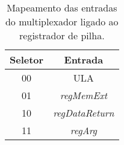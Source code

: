 \begin{table}[]
\centering
\begin{tabular}{|c|c|}
\hline
\textbf{Seletor} & \textbf{Entrada}       \\ \hline
00      & ULA           \\ \hline
01      & \textit{regMemExt}     \\ \hline
10      & \textit{regDataReturn} \\ \hline
11      & \textit{regArg}        \\ \hline
\end{tabular}
\caption{Mapeamento das entradas do multiplexador ligado ao registrador de pilha.}
\label{table_muxPilha}
\end{table}